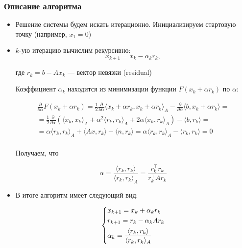 \subsubsection*{Описание алгоритма}

\begin{itemize}
    \item Решение системы будем искать итерационно. Инициализируем стартовую точку (например, $x_1 = 0$)

    \item $k$-ую итерацию вычислим рекурсивно:
    \[
    x_{k+1} = x_k - \alpha_k r_k,
    \]

    где $r_k = b - A x_k$ --- вектор невязки (residual)

    Коэффициент $\alpha_k$ находится из минимизации функции $F(x_k + \alpha r_k)$ по $\alpha$:

    \begin{multline*}
        \frac{\partial}{\partial \alpha} F(x_k + \alpha r_k) = \frac{1}{2} \frac{\partial}{\partial \alpha} \langle x_k + \alpha r_k, x_k + \alpha r_k \rangle_A - \frac{\partial}{\partial \alpha} \langle b, x_k + \alpha r_k \rangle = \\
        =\frac{1}{2} \frac{\partial}{\partial \alpha} \left(
        \langle x_k, x_k \rangle_A + \alpha^2 \langle r_k, r_k \rangle_A + 2\alpha \langle x_k, r_k \rangle_A
        \right) - \langle b, r_k \rangle = \\
        = \alpha \langle r_k, r_k \rangle_A + \langle Ax, r_k \rangle - \langle n, r_k \rangle = \alpha \langle r_k, r_k \rangle_A - \langle r_k, r_k \rangle = 0 \\
    \end{multline*}

    Получаем, что

    \[
    \alpha = \frac{\langle r_k, r_k \rangle}{\langle r_k, r_k \rangle_A} = \frac{r_k^{\top} r_k}{r_k^{\top} A r_k}
    \]

    \item В итоге алгоритм имеет следующий вид:

    \begin{equation*}
        \begin{dcases*}
            x_{k+1} = x_k + \alpha_k r_k\\
            r_{k+1} = r_k - \alpha_k A r_k\\
            \alpha_k = \frac{\langle r_k, r_k \rangle}{\langle r_k, r_k \rangle_A}\\
        \end{dcases*}
    \end{equation*}
\end{itemize}

